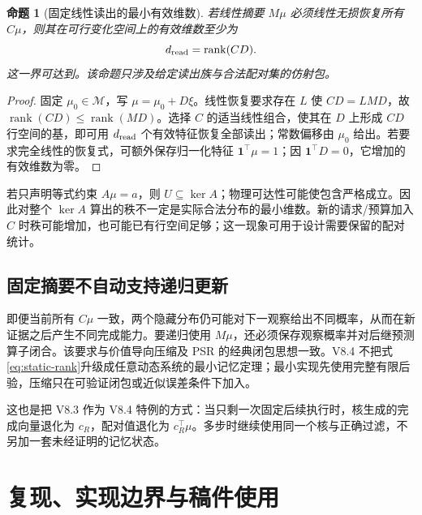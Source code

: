 \documentclass[11pt,a4paper,fontset=fandol]{ctexart}
\newtheorem{proposition}[theorem]{命题}
\theoremstyle{definition}
\theoremstyle{remark}
\numberwithin{equation}{section}
\newcommand{\rank}{\operatorname{rank}}
\begin{document}
\begin{proposition}[固定线性读出的最小有效维数]
若线性摘要 $M\mu$ 必须线性无损恢复所有 $C\mu$，则其在可行变化空间上的有效维数至少为
\begin{equation}
 d_{\rm read}=\rank(CD).
 \label{eq:static-rank}
\end{equation}
这一界可达到。该命题只涉及给定读出族与合法配对集的仿射包。
\end{proposition}
\begin{proof}
固定 $\mu_0\in\mathcal M$，写 $\mu=\mu_0+D\xi$。线性恢复要求存在 $L$ 使 $CD=LMD$，故 $\rank(CD)\le\rank(MD)$。选择 $C$ 的适当线性组合，使其在 $D$ 上形成 $CD$ 行空间的基，即可用 $d_{\rm read}$ 个有效特征恢复全部读出；常数偏移由 $\mu_0$ 给出。若要求完全线性的恢复式，可额外保存归一化特征 $\mathbf1^\top\mu=1$；因 $\mathbf1^\top D=0$，它增加的有效维数为零。
\end{proof}

若只声明等式约束 $A\mu=a$，则 $U\subseteq\ker A$；物理可达性可能使包含严格成立。因此对整个 $\ker A$ 算出的秩不一定是实际合法分布的最小维数。新的请求/预算加入 $C$ 时秩可能增加，也可能已有行空间足够；这一现象可用于设计需要保留的配对统计。

\subsection{固定摘要不自动支持递归更新}
即便当前所有 $C\mu$ 一致，两个隐藏分布仍可能对下一观察给出不同概率，从而在新证据之后产生不同完成能力。要递归使用 $M\mu$，还必须保存观察概率并对后继预测算子闭合。该要求与价值导向压缩及 PSR 的经典闭包思想一致\cite{compression,psr}。V8.4 不把式\eqref{eq:static-rank}升级成任意动态系统的最小记忆定理；最小实现先使用完整有限后验，压缩只在可验证闭包或近似误差条件下加入。

这也是把 V8.3 作为 V8.4 特例的方式：当只剩一次固定后续执行时，核生成的完成向量退化为 $c_R$，配对值退化为 $c_R^\top\mu$。多步时继续使用同一个核与正确过滤，不另加一套未经证明的记忆状态。

\section{复现、实现边界与稿件使用}
\label{app:reproduce}
\end{document}
